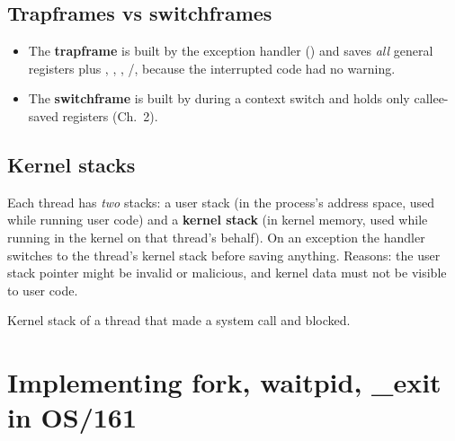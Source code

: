 \subsection{Trapframes vs switchframes}
\begin{itemize}
  \item The \textbf{trapframe} is built by the exception handler () and
    saves \emph{all} general registers plus , , ,
    /, because the interrupted code had no warning.
  \item The \textbf{switchframe} is built by  during a context switch
    and holds only callee-saved registers (Ch.~2).
\end{itemize}

\subsection{Kernel stacks}
Each thread has \emph{two} stacks: a user stack (in the process's address space, used while
running user code) and a \textbf{kernel stack} (in kernel memory, used while running in the
kernel on that thread's behalf). On an exception the handler switches  to the thread's
kernel stack before saving anything. Reasons: the user stack pointer might be invalid or
malicious, and kernel data must not be visible to user code.

\begin{center}
\end{center}
Kernel stack of a thread that made a  system call and blocked.

\section{Implementing fork, waitpid, \_exit in OS/161}

